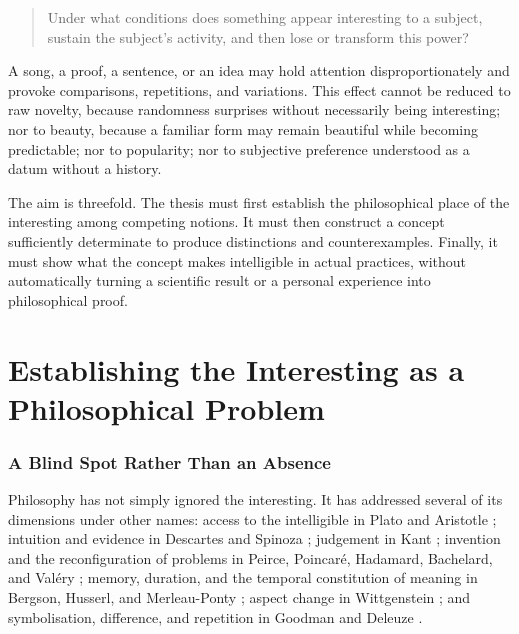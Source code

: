 \documentclass[11pt,a4paper]{article}
\begin{document}
\begin{quote}
Under what conditions does something appear interesting to a subject, sustain
the subject's activity, and then lose or transform this power?
\end{quote}

A song, a proof, a sentence, or an idea may hold attention disproportionately
and provoke comparisons, repetitions, and variations. This effect cannot be
reduced to raw novelty, because randomness surprises without necessarily being
interesting; nor to beauty, because a familiar form may remain beautiful while
becoming predictable; nor to popularity; nor to subjective preference
understood as a datum without a history.

The aim is threefold. The thesis must first establish the philosophical place of
the interesting among competing notions. It must then construct a concept
sufficiently determinate to produce distinctions and counterexamples. Finally,
it must show what the concept makes intelligible in actual practices, without
automatically turning a scientific result or a personal experience into
philosophical proof.

\part{Establishing the Interesting as a Philosophical Problem}

\section{A Blind Spot Rather Than an Absence}

Philosophy has not simply ignored the interesting. It has addressed several of
its dimensions under other names: access to the intelligible in Plato and
Aristotle
\parencite{platon2016republique,platon1995theetete,aristote1991metaphysique,aristote2005seconds};
intuition and evidence in Descartes and Spinoza
\parencite{descartes2002regles,descartes1992meditations,spinoza1966ethique};
judgement in Kant \parencite{kant2001raison,kant1993juger}; invention and the
reconfiguration of problems in Peirce, Poincaré, Hadamard, Bachelard, and Valéry
\parencite{peirce1955writings,poincare1908science,hadamard1959invention,bachelard1999formation,valery1973cahiers};
memory, duration, and the temporal constitution of meaning in Bergson, Husserl,
and Merleau-Ponty
\parencite{bergson2013evolution,bergson2013pensee,husserl1970experience,husserl1957logique,merleau1945phenomenologie};
aspect change in Wittgenstein \parencite{wittgenstein2004recherches}; and
symbolisation, difference, and repetition in Goodman and Deleuze
\parencite{goodman1976languages,deleuze1968difference}.
\end{document}
